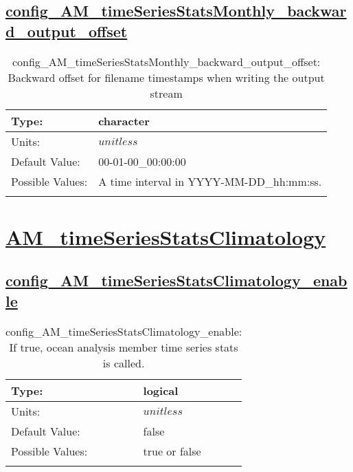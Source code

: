 \subsection[config\_AM\_timeSeriesStatsMonthly\_backward\_output\_offset]{\hyperref[sec:nm_tab_AM_timeSeriesStatsMonthly]{config\_AM\_timeSeriesStatsMonthly\_backward\_output\_offset}}
\label{subsec:nm_sec_config_AM_timeSeriesStatsMonthly_backward_output_offset}
\begin{center}
\begin{longtable}{| p{2.0in} || p{4.0in} |}
    \hline
    Type: & character \\
    \hline
    Units: & $unitless$ \\
    \hline
    Default Value: & 00-01-00\_00:00:00 \\
    \hline
    Possible Values: & A time interval in YYYY-MM-DD\_hh:mm:ss. \\
    \hline
    \caption{config\_AM\_timeSeriesStatsMonthly\_backward\_output\_offset: Backward offset for filename timestamps when writing the output stream}
\end{longtable}
\end{center}
\section[AM\_timeSeriesStatsClimatology]{\hyperref[sec:nm_tab_AM_timeSeriesStatsClimatology]{AM\_timeSeriesStatsClimatology}}
\label{sec:nm_sec_AM_timeSeriesStatsClimatology}
\subsection[config\_AM\_timeSeriesStatsClimatology\_enable]{\hyperref[sec:nm_tab_AM_timeSeriesStatsClimatology]{config\_AM\_timeSeriesStatsClimatology\_enable}}
\label{subsec:nm_sec_config_AM_timeSeriesStatsClimatology_enable}
\begin{center}
\begin{longtable}{| p{2.0in} || p{4.0in} |}
    \hline
    Type: & logical \\
    \hline
    Units: & $unitless$ \\
    \hline
    Default Value: & false \\
    \hline
    Possible Values: & true or false \\
    \hline
    \caption{config\_AM\_timeSeriesStatsClimatology\_enable: If true, ocean analysis member time series stats is called.}
\end{longtable}
\end{center}
